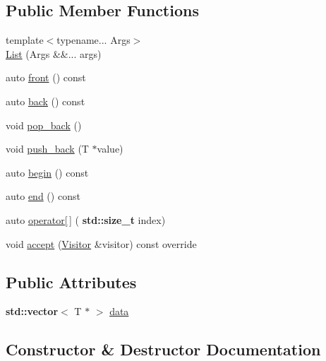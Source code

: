 \subsection*{Public Member Functions}
\begin{DoxyCompactItemize}
\item 
{\footnotesize template$<$typename... Args$>$ }\\\hyperlink{structast_1_1_list_a66b7804aee797f66f771d555b9b8a86c}{List} (Args \&\&... args)
\item 
auto \hyperlink{structast_1_1_list_ad9cc5344ebc6aee71875b407a24093f1}{front} () const
\item 
auto \hyperlink{structast_1_1_list_ae66fbd29bbd24c437ff03f803bdc028a}{back} () const
\item 
void \hyperlink{structast_1_1_list_ac13ecce7f8bedbda4f3f61fe5f61d0b1}{pop\+\_\+back} ()
\item 
void \hyperlink{structast_1_1_list_a78dd94897b4aea42d9c7851314c379d2}{push\+\_\+back} (T $\ast$value)
\item 
auto \hyperlink{structast_1_1_list_a93043c9c49ddedcaa697874e86c65b4e}{begin} () const
\item 
auto \hyperlink{structast_1_1_list_a7fda278b899341ea4c8fe28daae76a2d}{end} () const
\item 
auto \hyperlink{structast_1_1_list_ab054fddb258a6d0af1ce53e8b8dd6e27}{operator\mbox{[}$\,$\mbox{]}} (\textbf{ std\+::size\+\_\+t} index)
\item 
void \hyperlink{structast_1_1_list_ae0c4326fcf0cdf57edff409947e98f3a}{accept} (\hyperlink{structast_1_1_visitor}{Visitor} \&visitor) const override
\end{DoxyCompactItemize}
\subsection*{Public Attributes}
\begin{DoxyCompactItemize}
\item 
\textbf{ std\+::vector}$<$ T $\ast$ $>$ \hyperlink{structast_1_1_list_a72e2d088761f7ab3d91c4597c49281f1}{data}
\end{DoxyCompactItemize}


\subsection{Constructor \& Destructor Documentation}
\mbox{\label{structast_1_1_list_a66b7804aee797f66f771d555b9b8a86c}} 
